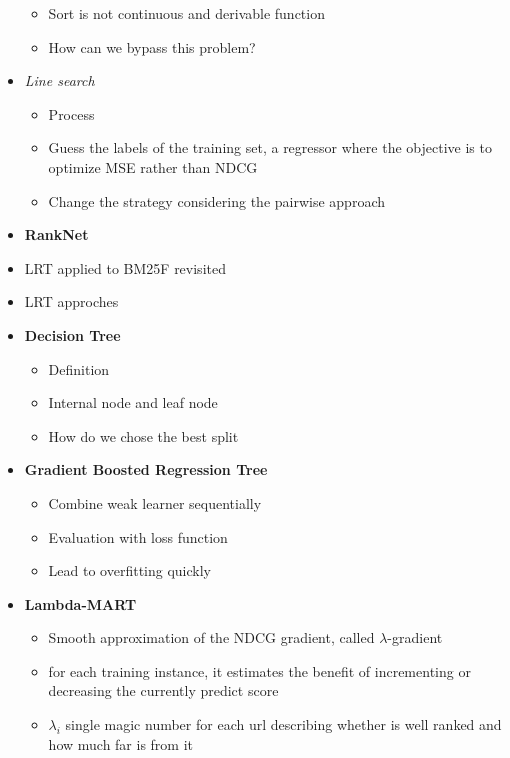 \begin{itemize}
\begin{itemize}
        \item Sort is not continuous and derivable function
        \item How can we bypass this problem?
    \end{itemize}
    \item \textit{Line search}
    \begin{itemize}
        \item Process
        \item Guess the labels of the training set, a regressor where the objective is to optimize MSE rather than NDCG
        \item Change the strategy considering the pairwise approach
    \end{itemize}
    \item \textbf{RankNet}
    \item LRT applied to BM25F revisited
    \item LRT approches
    \item \textbf{Decision Tree}
    \begin{itemize}
        \item Definition
        \item Internal node and leaf node
        \item How do we chose the best split
    \end{itemize}
    \item \textbf{Gradient Boosted Regression Tree}
    \begin{itemize}
        \item Combine weak learner sequentially
        \item Evaluation with loss function
        \item Lead to overfitting quickly
    \end{itemize}
    \item \textbf{Lambda-MART}
    \begin{itemize}
        \item Smooth approximation of the NDCG gradient, called \(\lambda\)-gradient
        \item for each training instance, it estimates the benefit of incrementing or decreasing the currently predict score
        \item \(\lambda_i\) single magic number for each url describing whether is well ranked and how much far is from it
    \end{itemize}


\end{itemize}
